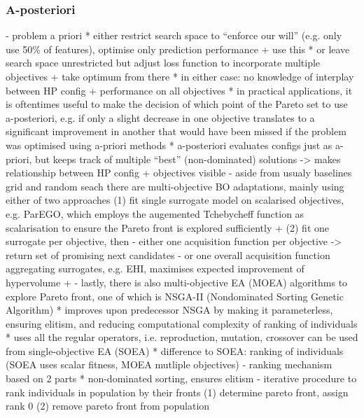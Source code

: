 \documentclass[twoside,11pt]{article}
\begin{document}
\subsubsection{A-posteriori}
\label{sec-moo-post}
- problem a priori
  * either restrict search space to ``enforce our will'' (e.g. only use 50\% of features), optimise only prediction performance + use this
  * or leave search space unrestricted but adjust loss function to incorporate multiple objectives + take optimum from there
  * in either case: no knowledge of interplay between HP config + performance on all objectives
  * in practical applications, it is oftentimes useful to make the decision of which point of the Pareto set to use a-posteriori, e.g. if only a slight decrease in
    one objective translates to a significant improvement in another that would have been missed if the problem was optimised using a-priori methods
  * a-posteriori evaluates configs just as a-priori, but keeps track of multiple ``best'' (non-dominated) solutions -> makes relationship between HP config + objectives visible
- aside from usualy baselines grid and random seach there are multi-objective BO adaptations, mainly using either of two approaches
  (1) fit single surrogate model on scalarised objectives, e.g. ParEGO, which employs the augemented Tchebycheff function as scalarisation to ensure the Pareto front is
      explored sufficiently \citep[pp. 15f]{10.1145/3610536} + \citep[pp. 54-56]{ParEGO}
  (2) fit one surrogate per objective, then
    - either one acquisition function per objective -> return set of promising next candidates
    - or one overall acquisition function aggregating surrogates, e.g. EHI, maximises expected improvement of hypervolume \citep[p. 16]{10.1145/3610536} + \citep[pp. 8f]{EHI}
- lastly, there is also multi-objective EA (MOEA) algorithms to explore Pareto front, one of which is NSGA-II (Nondominated Sorting Genetic Algorithm)
  * improves upon predecessor NSGA \citep{NSGA} by making it parameterless, ensuring elitism, and reducing computational complexity of ranking of individuals \citep[p. 182]{NSGA_II}
  * uses all the regular operators, i.e. reproduction, mutation, crossover can be used from single-objective EA (SOEA)
  * difference to SOEA: ranking of individuals (SOEA uses scalar fitness, MOEA mutliple objectives)
    - ranking mechanism based on 2 parts
      * non-dominated sorting, ensures elitism
        - iterative procedure to rank individuals in population by their fronts
        (1) determine pareto front, assign rank 0
        (2) remove pareto front from population
\end{document}
